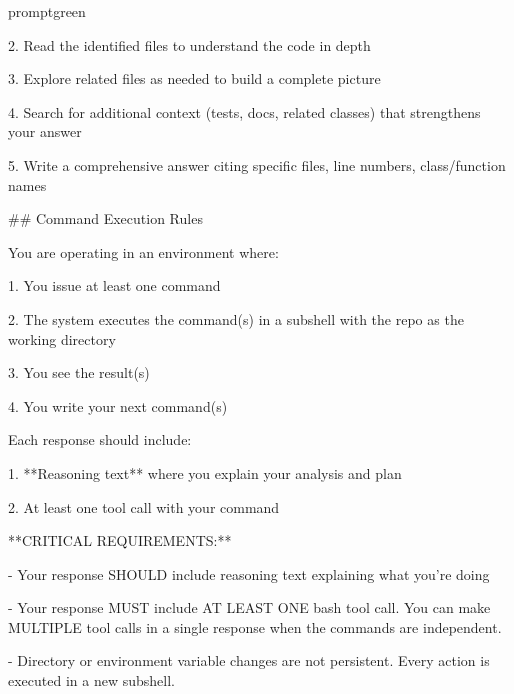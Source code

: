\begin{promptbox}{promptgreen}
{2. Read the identified files to understand the code in depth\par
3. Explore related files as needed to build a complete picture\par
4. Search for additional context (tests, docs, related classes) that strengthens your answer\par
5. Write a comprehensive answer citing specific files, line numbers, class/function names\par
\vspace{0.35em}\par
\#\# Command Execution Rules\par
\vspace{0.35em}\par
You are operating in an environment where:\par
\vspace{0.35em}\par
1. You issue at least one command\par
2. The system executes the command(s) in a subshell with the repo as the working directory\par
3. You see the result(s)\par
4. You write your next command(s)\par
\vspace{0.35em}\par
Each response should include:\par
\vspace{0.35em}\par
1. **Reasoning text** where you explain your analysis and plan\par
2. At least one tool call with your command\par
\vspace{0.35em}\par
**CRITICAL REQUIREMENTS:**\par
\vspace{0.35em}\par
- Your response SHOULD include reasoning text explaining what you're doing\par
- Your response MUST include AT LEAST ONE bash tool call. You can make MULTIPLE tool calls in a single response when the commands are independent.\par
- Directory or environment variable changes are not persistent. Every action is executed in a new subshell.\par
\vspace{0.35em}\par
}
\end{promptbox}
